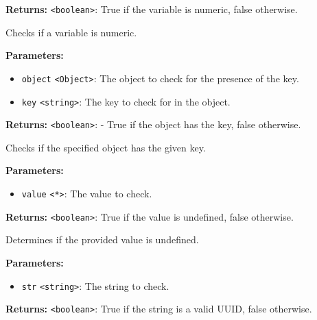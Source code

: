 \documentclass[12pt,a4paper]{article}
\begin{document}
\noindent \textbf{Returns:} \texttt{<boolean>}: True if the variable is numeric, false otherwise.

\noindent Checks if a variable is numeric.

\vspace{5mm}
\noindent {}


\noindent \textbf{Parameters:}
\begin{itemize}
  \item \texttt{object} \texttt{<Object>}: The object to check for the presence of the key.
  \item \texttt{key} \texttt{<string>}: The key to check for in the object.
\end{itemize}

\noindent \textbf{Returns:} \texttt{<boolean>}: - True if the object has the key, false otherwise.

\noindent Checks if the specified object has the given key.

\vspace{5mm}
\noindent {}


\noindent \textbf{Parameters:}
\begin{itemize}
  \item \texttt{value} \texttt{<*>}: The value to check.
\end{itemize}

\noindent \textbf{Returns:} \texttt{<boolean>}: True if the value is undefined, false otherwise.

\noindent Determines if the provided value is undefined.

\vspace{5mm}
\noindent {}


\noindent \textbf{Parameters:}
\begin{itemize}
  \item \texttt{str} \texttt{<string>}: The string to check.
\end{itemize}

\noindent \textbf{Returns:} \texttt{<boolean>}: True if the string is a valid UUID, false otherwise.
\end{document}
